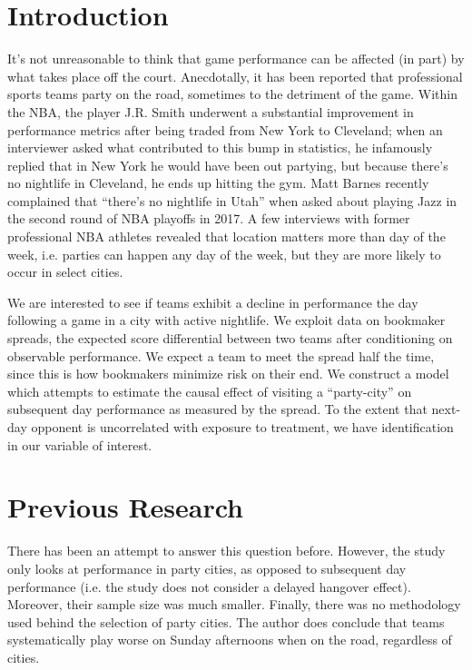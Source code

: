 \documentclass[letterpaper,12pt]{article}
\begin{document}

\section{Introduction}
It's not unreasonable to think that game performance can be affected 
(in part) by what takes place off the court. 
Anecdotally, it has been reported that professional sports teams party on 
the road, sometimes to the detriment of the game.
Within the NBA, the player J.R. Smith underwent a substantial improvement
in performance metrics after being traded from New York to Cleveland; when an interviewer
asked what contributed to this bump in statistics, he infamously replied
that in New York he would have been out partying, but because there's no nightlife
in Cleveland, he ends up hitting the gym.\cite{price,ley}
Matt Barnes recently complained that ``there's no nightlife in Utah'' when 
asked about playing Jazz in the second round of NBA playoffs in 2017.\cite{cestone}
A few interviews with former professional NBA athletes revealed that location
matters more than day of the week, i.e. parties can happen any day of the week,
but they are more likely to occur in select cities.

We are interested to see if 
teams exhibit a decline in performance the day following a game in a city 
with active nightlife. We exploit data on bookmaker spreads, the expected score 
differential between two teams after conditioning on observable performance. 
We expect a team to meet the spread half the time, since this is how bookmakers 
minimize risk on their end. We construct a model which attempts to 
estimate the causal effect of  visiting a ``party-city'' on subsequent day 
performance as measured by the spread. To the extent that next-day
opponent is uncorrelated with exposure to treatment, we have identification in our variable of interest.

\section{Previous Research}
There has been an attempt to answer this question before.\cite{ezekowitz} 
However, the study only
looks at performance in party cities, as opposed to subsequent day performance (i.e. the study does not consider a delayed hangover effect). Moreover, their sample size was much smaller. 
Finally, there was no methodology used behind the selection of party cities. The author does conclude
that teams systematically play worse on Sunday afternoons when on the road,
regardless of cities.
\end{document}
